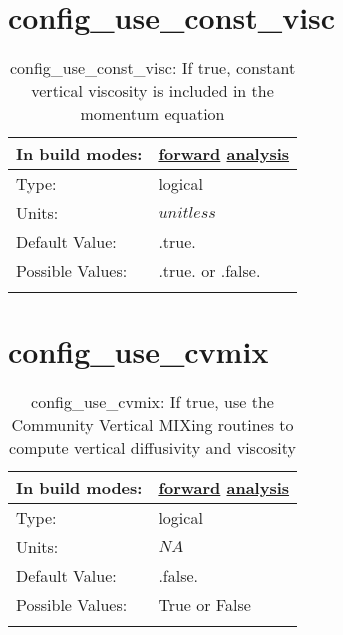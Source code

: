 \section[config\_use\_const\_visc]{config\_use\_const\_visc}
\label{sec:nm_sec_config_use_const_visc}
\begin{center}
\begin{longtable}{| p{2.0in} || p{4.0in} |}
    \hline
    In build modes: & \hyperref[subsec:forward_nm_tab_vmix_const]{forward} \hyperref[subsec:analysis_nm_tab_vmix_const]{analysis} \\
    \hline
    Type: & logical \\
    \hline
    Units: & $unitless$ \\
    \hline
    Default Value: & .true. \\
    \hline
    Possible Values: & .true. or .false. \\
    \hline
    \caption{config\_use\_const\_visc: If true, constant vertical viscosity is included in the momentum equation}
\end{longtable}
\end{center}
\section[config\_use\_cvmix]{config\_use\_cvmix}
\label{sec:nm_sec_config_use_cvmix}
\begin{center}
\begin{longtable}{| p{2.0in} || p{4.0in} |}
    \hline
    In build modes: & \hyperref[subsec:forward_nm_tab_cvmix]{forward} \hyperref[subsec:analysis_nm_tab_cvmix]{analysis} \\
    \hline
    Type: & logical \\
    \hline
    Units: & $NA$ \\
    \hline
    Default Value: & .false. \\
    \hline
    Possible Values: & True or False \\
    \hline
    \caption{config\_use\_cvmix: If true, use the Community Vertical MIXing routines to compute vertical diffusivity and viscosity}
\end{longtable}
\end{center}
